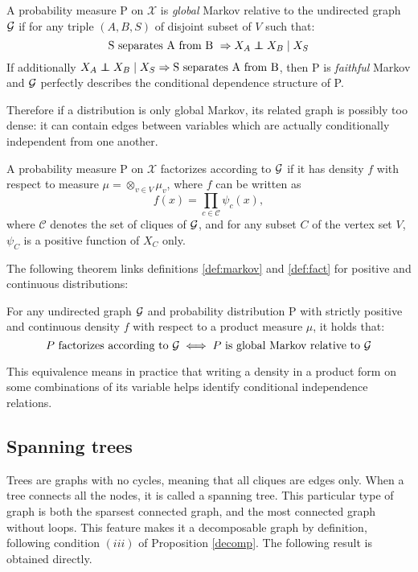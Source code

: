\begin{definition}\label{def:markov}
A probability measure P on $\mathcal{X}$ is \textit{global} Markov relative to the undirected graph $\mathcal{G}$ if for any triple $(A, B, S)$ of disjoint subset of $V$ such that:
 $$ \text{S separates A from B } \Rightarrow X_A\independent X_B \mid X_S$$
 If additionally $X_A\independent X_B \mid X_S \Rightarrow \text{S separates A from B}  $, then P is \textit{faithful} Markov and $\mathcal{G}$ perfectly describes the conditional dependence structure of P.
\end{definition}
Therefore if a distribution is only global Markov, its related graph is possibly too dense: it can contain edges between variables which are actually conditionally independent from one another. 
\begin{definition}[Factorization]\label{def:fact}
A probability measure P on $\mathcal{X}$ factorizes according to $\mathcal{G}$ if it has density $f$ with respect to measure $\mu = \otimes_{v\in V} \mu_v$, where $f$ can be written as
$$f(x) = \prod_{c\in \mathcal{C} }\psi_c(x),$$
where $\mathcal{C}$ denotes the set of cliques of $\mathcal{G}$, and for any subset $C$ of the vertex set $V$, $\psi_C$ is a positive function of $X_C$ only.
\end{definition}
The following theorem links definitions \ref{def:markov} and \ref{def:fact} for positive and continuous distributions:

\begin{theorem} \label{thm:ham}
For any undirected graph $\mathcal{G}$ and probability distribution P with strictly positive and continuous density $f$ with respect to a product measure $\mu$, it holds that:
$$P\text{ factorizes according to } \mathcal{G} \iff P\text{ is global Markov relative to }\mathcal{G} $$
\end{theorem}

This equivalence means in practice that writing a density in a product form on some combinations of its variable helps identify conditional independence relations.

 \subsection{Spanning trees}\label{trees}
Trees are graphs with no cycles, meaning that all cliques are edges only. When a tree connects all the nodes, it is called a spanning tree. This particular type of graph is both the sparsest connected graph, and the most connected graph without loops. This feature makes it a decomposable graph by definition, following condition $(iii)$ of Proposition \ref{decomp}.  The following result is obtained directly.

